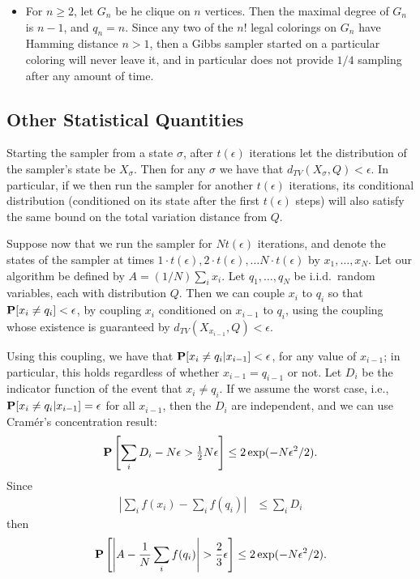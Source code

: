 \documentclass[11pt]{article} \usepackage{amssymb}
\newcommand{\half}{{\textstyle \frac12}}
\begin{document}
\begin{itemize}
\item
For $n \geq 2$, let $G_n$ be he clique on $n$ vertices. Then the maximal degree
of $G_n$ is $n-1$, and $q_n=n$. Since any two of the $n!$ legal colorings on 
$G_n$ have
Hamming distance $n>1$, then a Gibbs sampler started on a particular coloring
will never leave it, and in particular does not provide $1/4$ sampling after
any amount of time.


\end{itemize}
\subsection{Other Statistical Quantities}
Starting the sampler from a state $\sigma$, after $t(\epsilon)$ iterations
let the distribution of the sampler's state be $X_\sigma$. Then for any 
$\sigma$ we have that $d_{TV}(X_\sigma,Q)<\epsilon$. In particular, if we
then run the sampler for another $t(\epsilon)$ iterations, its conditional
distribution (conditioned on its state after the first $t(\epsilon)$ steps)
will also satisfy the same bound on the total variation distance from $Q$. 

Suppose now that we run the sampler for $Nt(\epsilon)$ iterations, and
denote the states of the sampler at times 
$1\cdot t(\epsilon),2\cdot t(\epsilon),\ldots N\cdot t(\epsilon)$ by
$x_1,\ldots,x_N$. Let our algorithm be defined by $A=(1/N)\sum_ix_i$. 
Let $q_1,\ldots,q_N$ be i.i.d.\ random variables, each with
distribution $Q$. Then we can couple $x_i$ to $q_i$ so that 
$\P[x_i\neq q_i]<\epsilon$, by coupling  $x_i$ conditioned on $x_{i-1}$ 
 to $q_i$, using the coupling whose existence is guaranteed by $d_{TV}(X_{x_{i-1}},Q)<\epsilon$. 

Using this coupling, we have that $\P[x_i\neq q_i|x_{i-1}]<\epsilon$, for any
value of $x_{i-1}$; in particular, this holds regardless of
whether $x_{i-1}=q_{i-1}$ or not. 
Let $D_i$ be the indicator function of the event that $x_i\neq q_i$.
If we assume the worst case, i.e., 
 $\P[x_i\neq q_i|x_{i-1}]=\epsilon$ for all $x_{i-1}$, 
then the $D_i$ are independent, and we 
can use Cram\'er's concentration result:
\begin{align*}
  \P\left[\sum_i D_i-N\epsilon>\half N\epsilon\right] \leq 2\exp(-N\epsilon^2/2).
\end{align*}
Since
\begin{align*}
  \left|\sum_if(x_i)-\sum_if(q_i)\right| & \leq \sum_i D_i
\end{align*}
then
\begin{align*}
  \P\left[\left|A-{1\over N}\sum_if(q_i)\right|>{2\over 3}\epsilon\right] \leq 2\exp(-N\epsilon^2/2).
\end{align*}
\end{document}
